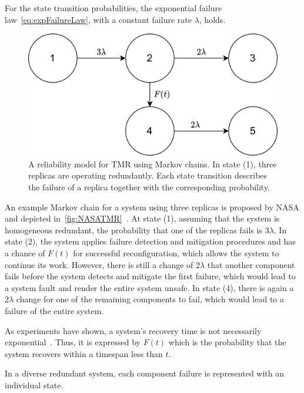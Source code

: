 For the state transition probabilities, the exponential failure law~\autoref{eq:expFailureLaw}, with a constant failure rate $\lambda$, holds.

\begin{figure}[!hb]
	\centering
	\includegraphics[width=0.75\linewidth]{images/TriplexSystemNASA}
	\caption{A reliability model for \gls*{TMR} using Markov chains. In state (1), three replicas are operating redundantly. Each state transition describes the failure of a replica together with the corresponding probability.}
	\label{fig:NASATMR}
\end{figure}

An example Markov chain for a system using three replicas is proposed by NASA and depicted in~\autoref{fig:NASATMR}~\cite{NASAMarkovChains}.
At state (1), assuming that the system is homogeneous redundant, the probability that one of the replicas fails is $3\lambda$.
In state (2), the system applies failure detection and mitigation procedures and has a chance of $F(t)$ for successful reconfiguration, which allows the system to continue its work.
However, there is still a change of $2\lambda$ that another component fails before the system detects and mitigate the first failure, which would lead to a system fault and render the entire system unsafe.
In state (4), there is again a $2\lambda$ change for one of the remaining components to fail, which would lead to a failure of the entire system.

As experiments have shown, a system's recovery time is not necessarily exponential~\cite{TheoryAndPracticeReliableSystem}.
Thus, it is expressed by $F(t)$ which is the probability that the system recovers within a timespan less than $t$.

In a diverse redundant system, each component failure is represented with an individual state.

